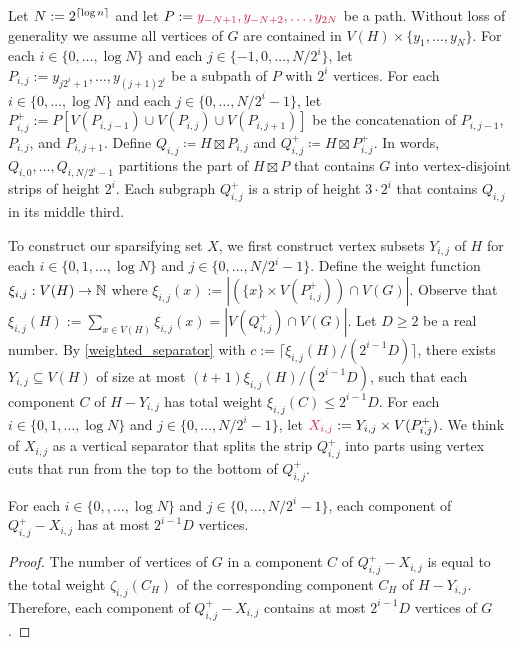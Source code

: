 \documentclass{patmorin}
\makeatletter
\renewcommand{\ge}{\geqslant}
\renewcommand{\le}{\leqslant}
\def\mathcolor#1#{\@mathcolor{#1}}
\def\@mathcolor#1#2#3{%
  \protect\leavevmode
  \begingroup
    \color#1{#2}#3%
  \endgroup
}
\newcommand{\mathdefin}[1]{\mathcolor{brightmaroon}{#1}}
\makeatother
\begin{document}
Let $N:=2^{{\lceil \log n \rceil}}$ and let $P:=\mathdefin{y_{-N+1},y_{-N+2},\ldots,y_{2N}}$ be a path.  Without loss of generality we assume all vertices of $G$ are contained in $V(H)\times\{y_1,\ldots,y_N\}$.  For each $i\in\{0,\ldots,\log N\}$ and each $j\in\{-1,0,\ldots,N/2^{i}\}$, let $P_{i,j}:=y_{j2^i+1},\ldots,y_{(j+1)2^i}$ be a subpath of $P$ with $2^i$ vertices. For each $i\in\{0,\ldots,\log N\}$ and each $j\in\{0,\ldots,N/2^{i}-1\}$, let $P^+_{i,j}:=P[V(P_{i,j-1})\cup V(P_{i,j})\cup V(P_{i,j+1})]$ be the concatenation of $P_{i,j-1}$, $P_{i,j}$, and $P_{i,j+1}$. Define $Q_{i,j}\coloneqq H\boxtimes P_{i,j}$ and $Q^+_{i,j}\coloneqq H\boxtimes P^+_{i,j}$.
In words, $Q_{i,0},\ldots,Q_{i,N/2^i-1}$ partitions the part of $H\boxtimes P$ that contains $G$ into vertex-disjoint strips of height $2^i$. Each subgraph $Q^+_{i,j}$ is a strip of height $3\cdot 2^i$ that contains $Q_{i,j}$ in its middle third.

To construct our sparsifying set $X$, we first construct vertex subsets $Y_{i,j}$ of $H$ for each $i\in\{0,1,\ldots,\log N\}$ and $j\in\{0,\ldots,N/2^{i}-1\}$.  Define the weight function $\xi_{i,j}:V(H)\to\mathbb{N}$ where $\xi_{i,j}(x):=|(\{x\}\times V(P^+_{i,j})) \cap V(G)|$.  Observe that $\xi_{i,j}(H):=\sum_{x\in V(H)} \xi_{i,j}(x)=|V(Q^+_{i,j})\cap V(G)|$. Let $D\ge 2$ be a real number.  By \cref{weighted_separator} with $c:=\lceil\xi_{i,j}(H)/(2^{i-1}D)\rceil$, there exists $Y_{i,j}\subseteq V(H)$ of size at most $(t+1)\xi_{i,j}(H)/(2^{i-1}D)$, such that each component $C$ of $H-Y_{i,j}$ has total weight $\xi_{i,j}(C)\le 2^{i-1}D$.  For each $i\in\{0,1,\ldots,\log N\}$ and $j\in\{0,\ldots,N/2^{i}-1\}$, let $\mathdefin{X_{i,j}}:=Y_{i,j}\times V(P^+_{i,j})$.  We think of $X_{i,j}$ as a vertical separator that splits the strip $Q^+_{i,j}$ into parts using vertex cuts that run from the top to the bottom of $Q^+_{i,j}$.

\begin{clm}\label{component_sizes}
  For each $i\in\{0,,\ldots,\log N\}$ and $j\in\{0,\ldots,N/2^{i}-1\}$, each component of $Q^+_{i,j}-X_{i,j}$ has at most $2^{i-1}D$ vertices.\
\end{clm}

\begin{proof}
  The number of vertices of $G$ in a component $C$ of $Q^+_{i,j}-X_{i,j}$ is equal to the total weight $\zeta_{i,j}(C_H)$ of the corresponding component $C_H$ of $H-Y_{i,j}$.  Therefore, each component of $Q^+_{i,j}-X_{i,j}$ contains at most $2^{i-1}D$ vertices of $G$.
\end{proof}
\end{document}
